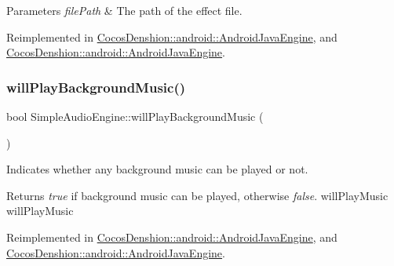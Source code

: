 \begin{DoxyParams}{Parameters}
{\em file\+Path} & The path of the effect file. \\
\hline
\end{DoxyParams}


Reimplemented in \hyperlink{classCocosDenshion_1_1android_1_1AndroidJavaEngine_a7d11887670799c98fdeb2b7ece2efad9}{Cocos\+Denshion\+::android\+::\+Android\+Java\+Engine}, and \hyperlink{classCocosDenshion_1_1android_1_1AndroidJavaEngine_abd45269bfe825e27b489fccc963b57c0}{Cocos\+Denshion\+::android\+::\+Android\+Java\+Engine}.

\mbox{\label{classCocosDenshion_1_1SimpleAudioEngine_af2a5eb0c4a7127c62a0c61dfd285d076}} 
\subsubsection{\texorpdfstring{will\+Play\+Background\+Music()}{willPlayBackgroundMusic()}\hspace{0.1cm}{\footnotesize\ttfamily [1/2]}}
{\footnotesize\ttfamily bool Simple\+Audio\+Engine\+::will\+Play\+Background\+Music (\begin{DoxyParamCaption}{ }\end{DoxyParamCaption})\hspace{0.3cm}{\ttfamily [virtual]}}

Indicates whether any background music can be played or not.

\begin{DoxyReturn}{Returns}
{\itshape true} if background music can be played, otherwise {\itshape false}.  will\+Play\+Music  will\+Play\+Music 
\end{DoxyReturn}


Reimplemented in \hyperlink{classCocosDenshion_1_1android_1_1AndroidJavaEngine_a3d3d6f0913b802f34598d4a89023a21f}{Cocos\+Denshion\+::android\+::\+Android\+Java\+Engine}, and \hyperlink{classCocosDenshion_1_1android_1_1AndroidJavaEngine_aa6301c0260249ef37088872b3710adeb}{Cocos\+Denshion\+::android\+::\+Android\+Java\+Engine}.

\mbox{\label{classCocosDenshion_1_1SimpleAudioEngine_ad9bf3fc744d4421c24d2e33832ba929f}} 
